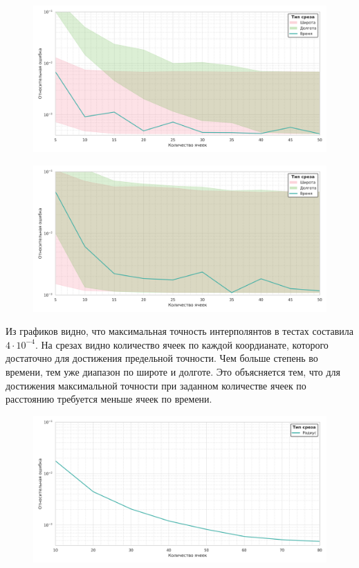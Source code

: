  \begin{figure}[h!]
    \centering
    \includegraphics[width=\linewidth]{../images/solution/atmo/2735.png}
    \label{fig:atmo:2735}
 \end{figure}

 \begin{figure}[h!]
    \centering
    \includegraphics[width=\linewidth]{../images/solution/atmo/2753.png}
    \label{fig:atmo:2753}
 \end{figure}

 Из графиков видно, что максимальная точность интерполянтов в тестах составила $4 \cdot 10^{-4}$.
 На срезах видно количество ячеек по каждой коордианате, которого достаточно для достижения
 предельной точности. Чем больше степень во времени, тем уже диапазон по широте и долготе. Это объясняется тем,
 что для достижения максимальной точности при заданном количестве ячеек по расстоянию
 требуется меньше ячеек по времени.

 \begin{figure}[h!]
    \centering
    \includegraphics[width=\linewidth]{../images/solution/atmo/2357_rho.png}
    \label{fig:atmo:2357_rho}
 \end{figure}

\clearpage